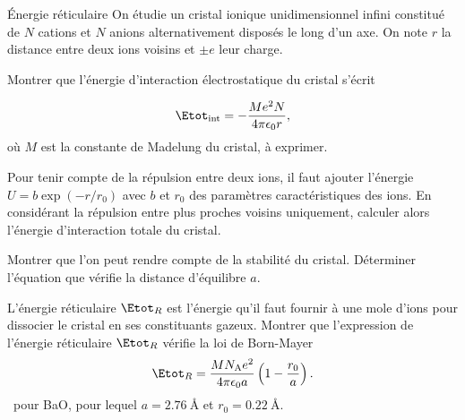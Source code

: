 \begin{exo}[PC][2][TD]{Énergie réticulaire}
On étudie un cristal ionique unidimensionnel infini constitué de $N$ cations et $N$ anions alternativement disposés le long d'un axe. On note $r$ la distance entre deux ions voisins et $\pm e$ leur charge.


\begin{quest}
  \item	
  Montrer que l'énergie d'interaction électrostatique du cristal s'écrit
  
  \begin{equation}
    \Etot_{\rm int}=-\frac{M e^2 N }{4 \pi \epsilon_0 r},
  \end{equation}
  où $M$ est la constante de Madelung du cristal, à exprimer.

  
  \item Pour tenir compte de la répulsion entre deux ions, il faut ajouter l'énergie $U=b \exp \left(-r / r_0\right)$ avec $b$ et $r_0$ des paramètres caractéristiques des ions. En considérant la répulsion entre plus proches voisins uniquement, calculer alors l'énergie d'interaction totale du cristal.
  \item Montrer que l'on peut rendre compte de la stabilité du cristal. Déterminer l'équation que vérifie la distance d'équilibre $a$.
  \item L'énergie réticulaire $\Etot_R$ est l'énergie qu'il faut fournir à une mole d'ions pour dissocier le cristal en ses constituants gazeux. Montrer que l'expression de l'énergie réticulaire $\Etot_R$ vérifie la loi de Born-Mayer 
  \begin{equation}
    \Etot_R=\frac{M N_{\mathrm{A}} e^2}{4 \pi \epsilon_0 a}\left(1-\frac{r_0}{a}\right).
  \end{equation}
  \AN~pour BaO, pour lequel $a=\SI{2.76}{\angstrom}$ et $r_0=\SI{0.22}{\angstrom}$.
\end{quest}
\end{exo}
